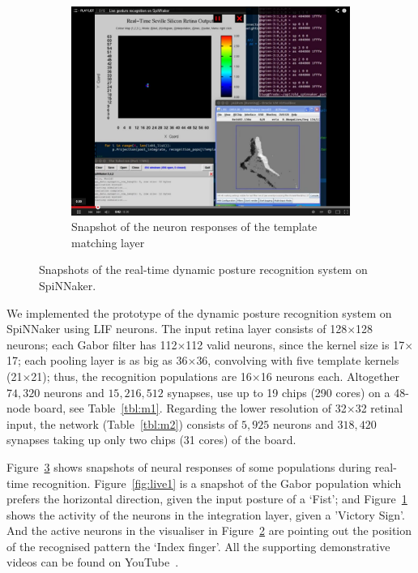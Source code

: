 \begin{figure}[h!]
\begin{subfigure}[t]{0.48\textwidth}
		\label{fig:live2}
	\end{subfigure}
	\\
	\begin{subfigure}[t]{\textwidth}
		\includegraphics[width=\textwidth]{pics/live_colour.png}
		\caption{Snapshot of the neuron responses of the template matching layer~\cite{video3}}
		\label{fig:live3}
	\end{subfigure}	
	
	\caption{Snapshots of the real-time dynamic posture recognition system on SpiNNaker.
	}
	\label{fig:live}
\end{figure}
We implemented the prototype of the dynamic posture recognition system on SpiNNaker using LIF neurons. 
The input retina layer consists of 128$\times$128 neurons; 
each Gabor filter has 112$\times$112 valid neurons, since the kernel size is 17$\times$17; 
each pooling layer is as big as 36$\times$36, convolving with five template kernels (21$\times$21); 
thus, the recognition populations are 16$\times$16 neurons each. Altogether $74,320$ neurons and $15,216,512$ synapses, use up to 19 chips (290 cores) on a 48-node board, see Table~\ref{tbl:m1}. Regarding the lower resolution of 32$\times$32 retinal input, the network (Table~\ref{tbl:m2}) consists of $5,925$ neurons and $318,420$ synapses taking up only two chips (31 cores) of the board.

Figure~\ref{fig:live} shows snapshots of neural responses of some populations during real-time recognition.
Figure~\ref{fig:live1} is a snapshot of the Gabor population which prefers the horizontal direction, given the input posture of a `Fist'; and Figure~\ref{fig:live2} shows the activity of the neurons in the integration layer, given a 'Victory Sign'.
And the active neurons in the visualiser in Figure~\ref{fig:live3} are pointing out the position of the recognised pattern the `Index finger'. 
All the supporting demonstrative videos can be found on YouTube~\cite{video1, video2, video3}. %


